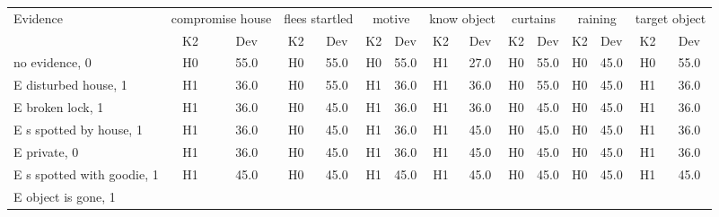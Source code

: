 \begin{table}\begin{tabular}{l|cc|cc|cc|cc|cc|cc|cc}\toprule\multirow{2}{*}{Evidence} & \multicolumn{2}{c}{compromise house}& \multicolumn{2}{c}{flees startled}& \multicolumn{2}{c}{motive}& \multicolumn{2}{c}{know object}& \multicolumn{2}{c}{curtains}& \multicolumn{2}{c}{raining}& \multicolumn{2}{c}{target object}\\& {K2} & {Dev}& {K2} & {Dev}& {K2} & {Dev}& {K2} & {Dev}& {K2} & {Dev}& {K2} & {Dev}& {K2} & {Dev}\\\midrule
no evidence, 0 & \cellcolor{Bittersweet}H0&\cellcolor{Bittersweet}55.0&\cellcolor{Bittersweet}H0&\cellcolor{Bittersweet}55.0&\cellcolor{Bittersweet}H0&\cellcolor{Bittersweet}55.0&\cellcolor{Bittersweet}H1&\cellcolor{Bittersweet}27.0&\cellcolor{Bittersweet}H0&\cellcolor{Bittersweet}55.0&\cellcolor{Bittersweet}H0&\cellcolor{Bittersweet}45.0&\cellcolor{Bittersweet}H0&\cellcolor{Bittersweet}55.0\\E disturbed house, 1 & \cellcolor{Bittersweet}H1&\cellcolor{Bittersweet}36.0&\cellcolor{Bittersweet}H0&\cellcolor{Bittersweet}55.0&\cellcolor{Bittersweet}H1&\cellcolor{Bittersweet}36.0&\cellcolor{Bittersweet}H1&\cellcolor{Bittersweet}36.0&\cellcolor{Bittersweet}H0&\cellcolor{Bittersweet}55.0&\cellcolor{Bittersweet}H0&\cellcolor{Bittersweet}45.0&\cellcolor{Bittersweet}H1&\cellcolor{Bittersweet}36.0\\E broken lock, 1 & \cellcolor{Bittersweet}H1&\cellcolor{Bittersweet}36.0&\cellcolor{Bittersweet}H0&\cellcolor{Bittersweet}45.0&\cellcolor{Bittersweet}H1&\cellcolor{Bittersweet}36.0&\cellcolor{Bittersweet}H1&\cellcolor{Bittersweet}36.0&\cellcolor{Bittersweet}H0&\cellcolor{Bittersweet}45.0&\cellcolor{Bittersweet}H0&\cellcolor{Bittersweet}45.0&\cellcolor{Bittersweet}H1&\cellcolor{Bittersweet}36.0\\E s spotted by house, 1 & \cellcolor{Bittersweet}H1&\cellcolor{Bittersweet}36.0&\cellcolor{Bittersweet}H0&\cellcolor{Bittersweet}45.0&\cellcolor{Bittersweet}H1&\cellcolor{Bittersweet}36.0&\cellcolor{Bittersweet}H1&\cellcolor{Bittersweet}45.0&\cellcolor{Bittersweet}H0&\cellcolor{Bittersweet}45.0&\cellcolor{Bittersweet}H0&\cellcolor{Bittersweet}45.0&\cellcolor{Bittersweet}H1&\cellcolor{Bittersweet}36.0\\E private, 0 & \cellcolor{Bittersweet}H1&\cellcolor{Bittersweet}36.0&\cellcolor{Bittersweet}H0&\cellcolor{Bittersweet}45.0&\cellcolor{Bittersweet}H1&\cellcolor{Bittersweet}36.0&\cellcolor{Bittersweet}H1&\cellcolor{Bittersweet}45.0&\cellcolor{Bittersweet}H0&\cellcolor{Bittersweet}45.0&\cellcolor{Bittersweet}H0&\cellcolor{Bittersweet}45.0&\cellcolor{Bittersweet}H1&\cellcolor{Bittersweet}36.0\\E s spotted with goodie, 1 & \cellcolor{Bittersweet}H1&\cellcolor{Bittersweet}45.0&\cellcolor{Bittersweet}H0&\cellcolor{Bittersweet}45.0&\cellcolor{Bittersweet}H1&\cellcolor{Bittersweet}45.0&\cellcolor{Bittersweet}H1&\cellcolor{Bittersweet}45.0&\cellcolor{Bittersweet}H0&\cellcolor{Bittersweet}45.0&\cellcolor{Bittersweet}H0&\cellcolor{Bittersweet}45.0&\cellcolor{Bittersweet}H1&\cellcolor{Bittersweet}45.0\\E object is gone, 1 & 
\end{tabular}
\end{table}
